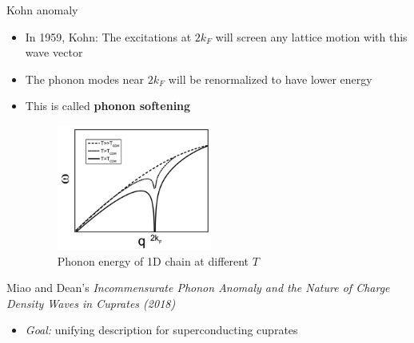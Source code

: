 \documentclass{beamer}
\newcommand*\vf[1]{\mathbf{#1}}
\newcommand{\mick}[1]{\textcolor{red}{[ #1 ]}}
\begin{document}
\begin{frame}{Kohn anomaly}
\begin{itemize}
\item In 1959, Kohn: The excitations at $2 k_F$ will screen any lattice motion with this wave vector
\item The phonon modes near $2 k_F$ will be renormalized to have lower energy
\item This is called \textbf{phonon softening}
\begin{figure}
\includegraphics[width=2in]{figs/kohn_anomaly.png}
\caption{\label{fig:kohn_anomaly} Phonon energy of 1D chain at different $T$}
\end{figure}
\end{itemize}
\end{frame}

\begin{frame}{Miao and Dean's \textit{Incommensurate Phonon Anomaly and the Nature of Charge Density Waves in Cuprates (2018)}}
\begin{itemize}
\item \textit{Goal:} unifying description for superconducting cuprates
\end{itemize}
\end{frame}

\end{document}
